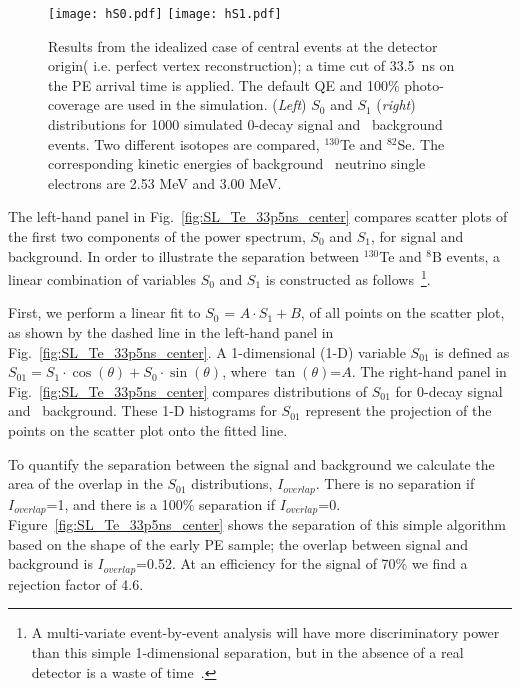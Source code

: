\begin{figure*}[h]
\centering
\texttt{[image: hS0.pdf]}
\texttt{[image: hS1.pdf]}
\caption{Results from the idealized case of central events at the
  detector origin( i.e. perfect vertex reconstruction); a time cut of 33.5~ns
  on the PE arrival time is applied. The default QE and 100\%
  photo-coverage are used in the simulation.  (\emph{Left}) $S_0$ and
  $S_1$ (\emph{right}) distributions for 1000 simulated 0\nbb-decay
  signal and \B~background events.  Two different isotopes are
  compared, $^{130}$Te and $^{82}$Se. The corresponding kinetic
  energies of background \B~neutrino single electrons are 2.53 MeV and
  3.00 MeV.}
\label{fig:S_vs_energy}
\end{figure*}

The left-hand panel in Fig.~\ref{fig:SL_Te_33p5ns_center} compares
scatter plots of the first two components of the power spectrum, $S_0$
and $S_1$, for signal and background. In order to illustrate the
separation between $^{130}$Te and $^{8}$B events, a linear combination
of variables $S_0$ and $S_1$ is constructed as follows~\footnote{A
multi-variate event-by-event analysis will have more discriminatory
power than this simple 1-dimensional separation, but in the absence of
a real detector is a waste of time~\cite{goldberger_watson}.}.

First, we perform a linear fit to $S_0$ = $A \cdot S_1 + B$, of all points on the
scatter plot, as shown by the dashed line in the left-hand
panel in Fig.~\ref{fig:SL_Te_33p5ns_center}. A 1-dimensional (1-D) variable
$S_{01}$ is defined as $S_{01} = S_1 \cdot \cos(\theta) + S_0 \cdot
\sin(\theta)$, where $\tan(\theta)$=$A$. The right-hand panel in
Fig.~\ref{fig:SL_Te_33p5ns_center} compares distributions of $S_{01}$
for 0\nbb-decay signal and \B~background. These 1-D histograms for
$S_{01}$ represent the projection of the points on the scatter plot
onto the fitted line.

To quantify the separation between the signal and background we
calculate the area of the overlap in the $S_{01}$ distributions,
$I_{overlap}$. There is no separation if $I_{overlap}$=1, and there is
a 100\% separation if
$I_{overlap}$=0. Figure~\ref{fig:SL_Te_33p5ns_center} shows the
separation of this simple algorithm based on the shape of the early PE
sample; the overlap between signal and background is
$I_{overlap}$=0.52. At an efficiency for the signal of
70\% we find a rejection factor of 4.6.


